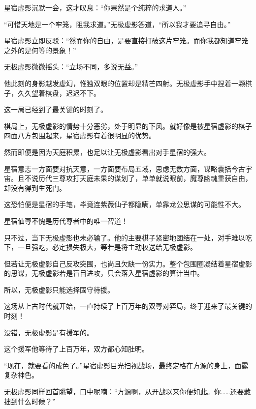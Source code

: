 \begin{this_body}
星宿虚影沉默一会，这才叹息：“你果然是个纯粹的求道人。”

“可惜天地是一个牢笼，阻我求道。”无极虚影答道，“所以我才要追寻自由。”

星宿虚影立即反驳：“然而你的自由，是要直接打破这片牢笼。而你我都知道牢笼之外的是何等的景象！”

无极虚影微微摇头：“立场不同，多说无益。”

他此刻的身影越发虚幻，惟独双眼的位置却是精芒四射。无极虚影手中捏着一颗棋子，久久望着棋盘，迟迟不下。

这一局已经到了最关键的时刻了。

棋局上，无极虚影的情势十分恶劣，处于明显的下风。就好像是被星宿虚影的棋子四面八方包围起来，星宿虚影有着很明显的优势。

然而即便是因为天庭积累，也足以让无极虚影看出对手星宿的强大。

星宿意志一方面要对抗天意，一方面要布局五域，思虑无数方面，谋略囊括今古宇宙。且不说历代三尊攻打天庭未果的谋划了，单单就说眼前，魔尊幽魂重获自由，却没有得到生死门。

这恐怕便是星宿的手笔，毕竟连紫薇仙子都隐瞒，单靠龙公思谋的可能性不大。

星宿仙尊不愧是历代尊者中的唯一智道！

只不过，当下无极虚影也未必输了。他的主要棋子紧密地团结在一处，对手难以吃下，一旦强吃，必定损失极大，等若是将主动权送给无极虚影。

但若让无极虚影自己反攻突围，也尚且欠缺一份实力。整个包围圈凝结着星宿虚影的思谋，无极虚影若是盲目进攻，只会落入星宿虚影的算计当中。

所以，无极虚影只能选择固守待援。

这场从上古时代就开始，一直持续了上百万年的双尊对弈局，终于迎来了最关键的时刻！

没错，无极虚影是有援军的。

这个援军他等待了上百万年，双方都心知肚明。

“现在，就要看的成色了。”星宿虚影目光扫视战场，最终定格在方源的身上，面露复杂神色。

无极虚影同样回首眺望，口中呢喃：“方源啊，从开战以来你便如此。你……还要藏拙到什么时候？”

\end{this_body}

